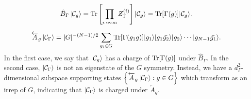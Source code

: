 \begin{equation*}
    \hat B_\Gamma\ket{\Cl_g}=\Tr\left[\prod_{i\text{ even}}\zt_\Gamma^{(i)}\right]|\mathcal{C}_g\rangle=\Tr[\Gamma(g)]|\mathcal{C}_g\rangle.
\end{equation*}

\begin{equation*}
    \overleftarrow{A}_g\ket{\mathcal{C}_\Gamma}=|G|^{-(N-1)/2}\sum_{{g_i}\in G}\text{Tr}[\Gamma(g_1g)]|g_1\rangle|g_1\bar{g_2}\rangle|g_2\rangle\cdots|g_{N-1}\bar{g_1}\rangle.
\end{equation*}
In the first case, we say that $\ket{\mathcal{C}_g}$ has a charge of $\text{Tr}[\Gamma(g)]$ under $\hat B_\Gamma$. In the second case, $\ket{\mathcal{C}_\Gamma}$ is not an eigenstate of the $G$ symmetry. Instead, we have a $d_{\Gamma}^2$-dimensional subspace supporting states
$\left\{\overleftarrow A_g\ket{\mathcal{C}_\Gamma}:g\in G\right\}$
which transform as an irrep of $G$, indicating that $\ket{\mathcal{C}_\Gamma}$ is charged under $\overleftarrow A_g$.